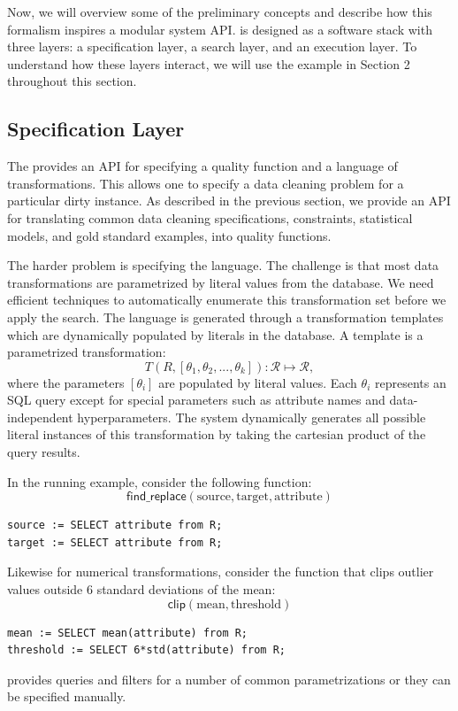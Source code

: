 Now, we will overview some of the preliminary concepts and describe how this formalism inspires a modular system API.
\sys is designed as a software stack with three layers: a specification layer, a search layer, and an execution layer.
To understand how these layers interact, we will use the example in Section 2 throughout this section.


\subsection{Specification Layer} The provides an API for specifying a quality function and a language of transformations. This allows one to specify a data cleaning problem for a particular dirty instance. As described in the previous section, we provide an API for translating common data cleaning specifications, constraints, statistical models, and gold standard examples, into quality functions. 

The harder problem is specifying the language. 
The challenge is that most data transformations are parametrized by literal values from the database.
We need efficient techniques to automatically enumerate this transformation set before we apply the search.
The language is generated through a transformation templates which are dynamically populated by literals in the database.
A template is a parametrized transformation:
\[T(R, [\theta_1, \theta_2,...,\theta_k] ): \mathcal{R} \mapsto  \mathcal{R},\] where the parameters $[\theta_i]$ are populated by literal values.
Each $\theta_i$ represents an SQL query except for special parameters such as attribute names and data-independent hyperparameters.
The system dynamically generates all possible literal instances of this transformation by taking the cartesian product of the query results.

In the running example, consider the following function:
\[
\textsf{find\_replace}(\text{source}, \text{target}, \text{attribute})
\]
\begin{lstlisting}
source := SELECT attribute from R;
target := SELECT attribute from R;
\end{lstlisting}
Likewise for numerical transformations, consider the function that clips outlier values outside 6 standard deviations of the mean:
\[
\textsf{clip}(\text{mean}, \text{threshold})
\]
\begin{lstlisting}
mean := SELECT mean(attribute) from R;
threshold := SELECT 6*std(attribute) from R;
\end{lstlisting}
\sys provides queries and filters for a number of common parametrizations or they can be specified manually.


